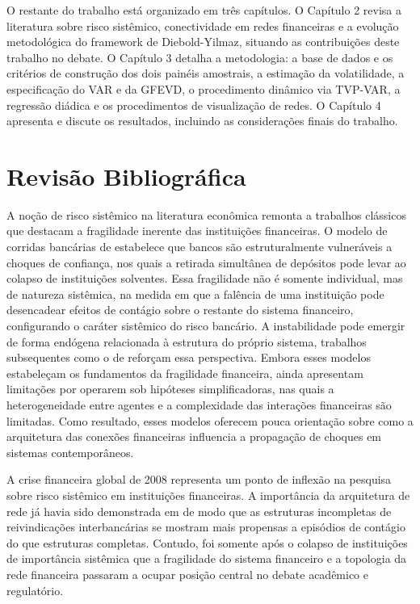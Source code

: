 \documentclass[12pt, a4paper, oneside, english, brazil]{abntex2}
\begin{document}
O restante do trabalho está organizado em três capítulos. O Capítulo 2 revisa a literatura 
sobre risco sistêmico, conectividade em redes financeiras e a evolução metodológica do 
framework de Diebold-Yilmaz, situando as contribuições deste trabalho no debate. O Capítulo 3 
detalha a metodologia: a base de dados e os critérios de construção dos dois painéis amostrais, 
a estimação da volatilidade, a especificação do VAR e da GFEVD, o procedimento dinâmico via 
TVP-VAR, a regressão diádica e os procedimentos de visualização de redes. O Capítulo 4 
apresenta e discute os resultados, incluindo as considerações finais do trabalho.   



\chapter{Revisão Bibliográfica}
\label{cap:revisao}

A noção de risco sistêmico na literatura econômica remonta a trabalhos
clássicos que destacam a fragilidade inerente das instituições financeiras.
O modelo de corridas bancárias de \textcite{diamond1983} estabelece que
bancos são estruturalmente vulneráveis a choques de confiança, nos quais a
retirada simultânea de depósitos pode levar ao colapso de instituições
solventes. Essa fragilidade não é somente individual, mas de natureza
sistêmica, na medida em que a falência de uma instituição pode desencadear
efeitos de contágio sobre o restante do sistema financeiro, configurando o
caráter sistêmico do risco bancário. A instabilidade pode
emergir de forma endógena relacionada à estrutura do próprio sistema, 
trabalhos subsequentes como o de \textcite{allen1998} reforçam essa perspectiva.
Embora esses modelos estabeleçam os fundamentos da fragilidade financeira,
ainda apresentam limitações por operarem sob hipóteses simplificadoras,
nas quais a heterogeneidade entre agentes e a complexidade das interações
financeiras são limitadas. Como resultado, esses modelos oferecem pouca
orientação sobre como a arquitetura das conexões financeiras influencia a
propagação de choques em sistemas contemporâneos.

A crise financeira global de 2008 representa um ponto de inflexão na pesquisa sobre
risco sistêmico em instituições financeiras. A importância da arquitetura de rede 
já havia sido demonstrada em \textcite{allen2000} de modo que as estruturas incompletas de 
reivindicações interbancárias se mostram mais propensas a episódios de contágio do que 
estruturas completas. Contudo, foi somente após o colapso de instituições de 
importância sistêmica que a fragilidade do sistema financeiro e a topologia da rede
financeira passaram a ocupar posição central no debate acadêmico e regulatório.
\end{document}
